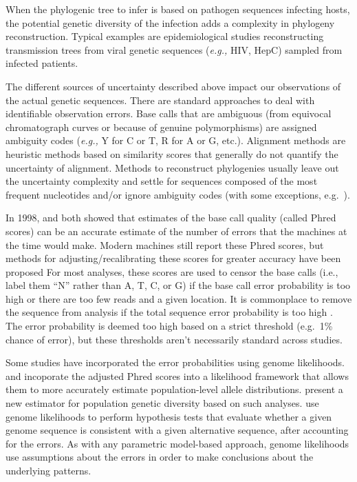 \documentclass[
]{article}
\newcommand{\eg}{\textit{e.g.,}\xspace}
\begin{document}
When the phylogenic tree to infer is based on pathogen sequences
infecting hosts, the potential genetic diversity of the infection adds a
complexity in phylogeny reconstruction. Typical examples are
epidemiological studies reconstructing transmission trees from viral
genetic sequences (\eg HIV, HepC) sampled from infected patients.

The different sources of uncertainty described above impact our
observations of the actual genetic sequences. There are standard
approaches to deal with identifiable observation errors. Base calls that
are ambiguous (from equivocal chromatograph curves or because of genuine
polymorphisms) are assigned ambiguity codes (\eg Y for C or T, R for A
or G, etc.). Alignment methods are heuristic methods based on similarity
scores that generally do not quantify the uncertainty of alignment.
Methods to reconstruct phylogenies usually leave out the uncertainty
complexity and settle for sequences composed of the most frequent
nucleotides and/or ignore ambiguity codes (with some exceptions,
e.g.~\citet{depristoFrameworkVariationDiscovery2011}).

In 1998, \citet{ewingBaseCallingAutomatedSequencer1998} and
\citet{richterichEstimationErrorsRaw1998} both showed that estimates of
the base call quality (called Phred scores) can be an accurate estimate
of the number of errors that the machines at the time would make. Modern
machines still report these Phred scores, but methods for
adjusting/recalibrating these scores for greater accuracy have been
proposed \citep[\citet{depristoFrameworkVariationDiscovery2011},
\citet{liSNPDetectionMassively2009}]{liAdjustQualityScores2004} For most
analyses, these scores are used to censor the base calls (i.e., label
them ``N'' rather than A, T, C, or G) if the base call error probability
is too high or there are too few reads and a given location. It is
commonplace to remove the sequence from analysis if the total sequence
error probability is too high \citep[see,
e.g.,][\citet{robaskyRoleReplicatesError2014},
\citet{oraweAccountingUncertaintyDNA2015}]{doroninaPhylogeneticPositionEmended2005}.
The error probability is deemed too high based on a strict threshold
(e.g.~1\% chance of error), but these thresholds aren't necessarily
standard across studies.

Some studies have incorporated the error probabilities using genome
likelihoods. \citet{depristoFrameworkVariationDiscovery2011} and
\citet{gompertHierarchicalBayesianModel2011} incoporate the adjusted
Phred scores into a likelihood framework that allows them to more
accurately estimate population-level allele distributions.
\citet{fumagalliQuantifyingPopulationGenetic2013a} present a new
estimator for population genetic diversity based on such analyses.
\citet{kuoEAGLEExplicitAlternative2018} use genome likelihoods to
perform hypothesis tests that evaluate whether a given genome sequence
is consistent with a given alternative sequence, after accounting for
the errors. As with any parametric model-based approach, genome
likelihoods use assumptions about the errors in order to make
conclusions about the underlying patterns.
\end{document}
